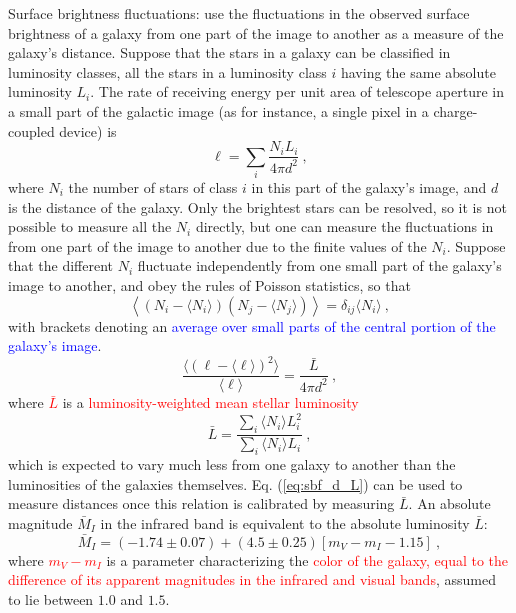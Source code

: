 \documentclass[12pt,a4paper]{article}
\begin{document}
\cite{2008cosm.book.....W} Surface brightness fluctuations: use the fluctuations in the observed surface brightness of a galaxy from one part of the image to another as a measure of the galaxy's distance. Suppose that the stars in a galaxy can be classified in luminosity classes, all the stars in a luminosity class $i$ having the same absolute luminosity $L_i$. The rate of receiving energy per unit area of telescope aperture in a small part of the galactic image (as for instance, a single pixel in a charge-coupled device) is
\begin{equation}
\ell = \sum_i \dfrac{N_i L_i}{4\pi d^2 } ~,
\end{equation}
where $N_i$ the number of stars of class $i$ in this part of the galaxy's image, and $d$ is the distance of the galaxy. Only the brightest stars can be resolved, so it is not possible to measure all the $N_i$ directly, but one can measure the fluctuations in from one part of the image to another due to the finite values of the $N_i$. Suppose that the different $N_i$ fluctuate independently from one small part of the galaxy’s image to another, and obey the rules of Poisson statistics, so that
\begin{equation}
\left\langle (N_i -\langle N_i \rangle) (N_j -\langle N_j \rangle) \right\rangle = \delta_{ij} \langle N_i \rangle ~,
\end{equation}
with brackets denoting an \textcolor{blue}{average over small parts of the central portion of the galaxy's image}.
\begin{equation}
\dfrac{\langle (\ell -\langle \ell \rangle)^2 \rangle}{\langle \ell \rangle} = \dfrac{\bar{L}}{4\pi d^2 }~,
\label{eq:sbf_d_L}
\end{equation}
where \textcolor{red}{$\bar{L}$} is a \textcolor{red}{luminosity-weighted mean stellar luminosity}
\begin{equation}
\bar{L} = \dfrac{\sum\limits_i \langle N_i \rangle L_i^2 }{\sum\limits_i \langle N_i \rangle L_i } ~,
\end{equation}
which is expected to vary much less from one galaxy to another than the luminosities of the galaxies themselves. Eq. (\ref{eq:sbf_d_L}) can be used to measure distances once this relation is calibrated by measuring $\bar{L}$. An absolute magnitude $\bar{M}_I$ in the infrared band is equivalent to the absolute luminosity $\bar{L}$:
\begin{equation}
\bar{M}_I = (-1.74 \pm 0.07) +(4.5\pm 0.25) [m_V -m_I - 1.15] ~,
\end{equation}
where \textcolor{red}{$m_V - m_I$} is a parameter characterizing the \textcolor{red}{color of the galaxy, equal to the difference of its apparent magnitudes in the infrared and visual bands}, assumed to lie between $1.0$ and $1.5$.
\end{document}
